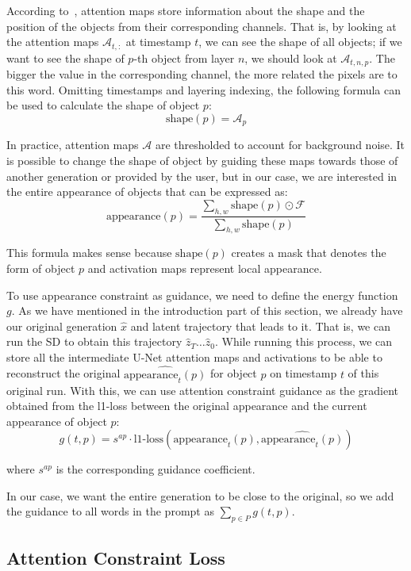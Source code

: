 According to~\cite{att_replace_silver_robots}, attention maps store information about the shape and the position of the objects from their corresponding channels.
That is, by looking at the attention maps $\mathcal{A}_{t,:}$ at timestamp $t$, we can see the shape of all objects; if we want to see the shape of $p$-th object from layer $n$, we should look at $\mathcal{A}_{t,n,p}$.
The bigger the value in the corresponding channel, the more related the pixels are to this word.
Omitting timestamps and layering indexing, the following formula can be used to calculate the shape of object $p$:
$$\text{shape}(p) = \mathcal{A}_p$$

In practice, attention maps $\mathcal{A}$ are thresholded to account for background noise. 
It is possible to change the shape of object by guiding these maps towards those of another generation or provided by the user, but in our case, we are interested in the entire appearance of objects that can be expressed as:
$$\text{appearance}(p) = \dfrac{\sum_{h,w}\text{shape}(p)\odot \mathcal{F}}{\sum_{h,w}\text{shape}(p)}$$

This formula makes sense because $\text{shape}(p)$ creates a mask that denotes the form of object $p$ and activation maps represent local appearance.

To use appearance constraint as guidance, we need to define the energy function $g$.
As we have mentioned in the introduction part of this section, we already have our original generation $\hat{x}$ and latent trajectory that leads to it. 
That is, we can run the SD to obtain this trajectory $\hat{z}_T\ldots\hat{z}_0$.
While running this process, we can store all the intermediate U-Net attention maps and activations to be able to reconstruct the original $\widehat{\text{appearance}_t(p)}$ for object $p$ on timestamp $t$ of this original run.
With this, we can use attention constraint guidance as the gradient obtained from the l1-loss between the original appearance and the current appearance of object $p$:
$$g(t, p) = s^{ap}\cdot \text{l1-loss}(\text{appearance}_t(p), \widehat{\text{appearance}_t(p)})$$

where $s^{ap}$ is the corresponding guidance coefficient.

In our case, we want the entire generation to be close to the original, so we add the guidance to all words in the prompt as $\sum_{p\in P} g(t,p)$.

\subsection{Attention Constraint Loss}

